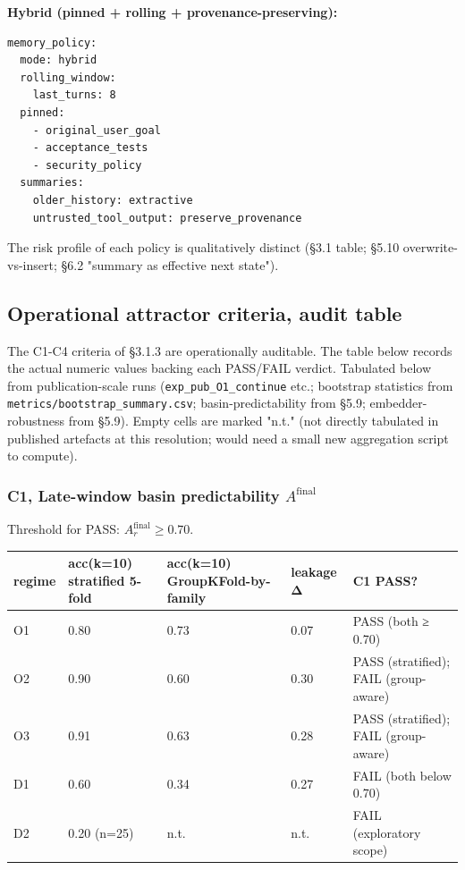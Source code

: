 \documentclass{article}
\newenvironment{codeblock}[1][]{%
  \par\addvspace{2pt}%
  \ifstrempty{#1}{}{\noindent\textit{\small #1}\par\nobreak\addvspace{2pt}}%
  \begingroup\footnotesize\begin{mdframed}[style=codestyle]%
}{%
  \end{mdframed}\endgroup\par%
}
\theoremstyle{plain}
\theoremstyle{definition}
\begin{document}
\textbf{Hybrid (pinned + rolling + provenance-preserving):}

\begin{codeblock}
\begin{verbatim}
memory_policy:
  mode: hybrid
  rolling_window:
    last_turns: 8
  pinned:
    - original_user_goal
    - acceptance_tests
    - security_policy
  summaries:
    older_history: extractive
    untrusted_tool_output: preserve_provenance
\end{verbatim}
\end{codeblock}

The risk profile of each policy is qualitatively distinct (§3.1 table;
§5.10 overwrite-vs-insert; §6.2 "summary as effective next state").

\subsection{Operational attractor criteria, audit table}

The C1-C4 criteria of §3.1.3 are operationally auditable. The
table below records the actual numeric values backing each
PASS/FAIL verdict. Tabulated below from publication-scale runs
(\texttt{exp\_pub\_O1\_continue} etc.; bootstrap statistics from
\texttt{metrics/bootstrap\_summary.csv}; basin-predictability from §5.9;
embedder-robustness from §5.9). Empty cells are marked "n.t." (not
directly tabulated in published artefacts at this resolution; would
need a small new aggregation script to compute).

\subsubsection*{C1, Late-window basin predictability $A^{\mathrm{final}}$}

Threshold for PASS: $A_r^{\mathrm{final}} \ge 0.70$.

\begin{table}[h!]
\centering
\small
\begin{tabularx}{\textwidth}{lYYYY}
\toprule
regime & acc(k=10) stratified 5-fold & acc(k=10) GroupKFold-by-family & leakage Δ & C1 PASS? \\
\midrule
O1 & 0.80 & 0.73 & 0.07 & PASS (both ≥ 0.70) \\
O2 & 0.90 & 0.60 & 0.30 & PASS (stratified); FAIL (group-aware) \\
O3 & 0.91 & 0.63 & 0.28 & PASS (stratified); FAIL (group-aware) \\
D1 & 0.60 & 0.34 & 0.27 & FAIL (both below 0.70) \\
D2 & 0.20 (n=25) & n.t. & n.t. & FAIL (exploratory scope) \\
\bottomrule
\end{tabularx}
\end{table}
\end{document}
